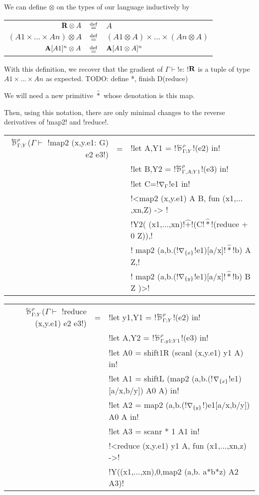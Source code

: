 We can define $\otimes$ on the types of our language inductively by

\begin{tabular}{r c l}
    $\mathbf{R} \otimes A$ & $\stackrel {\mathrm{def}}=$ & $A$ \\
    $(A1 \times \ldots \times An)\otimes A$ & $\stackrel {\mathrm{def}}=$ & $(A1\otimes A) \times \ldots \times (An \otimes A)$ \\
    $\mathbf{A}[A1]^{n} \otimes A$ & $\stackrel {\mathrm{def}}=$ & $\mathbf{A}[A1\otimes A]^{n}$
\end{tabular}

With this definition, we recover that the gradient of $\Gamma \vdash$!e: !$\mathbf{R}$ is a tuple of type $A1\times\ldots\times An$ as expected.
TODO: define *, finish D(reduce)

We will need a new primitive $\widehat{*}$ whose denotation is this map.

Then, using this notation, there are only minimal changes to the reverse derivatives of !map2! and !reduce!.

\begin{center}
\begin{tabular}{r c l}
    $\directD{\rho}{\Gamma}{Y}$($\Gamma\vdash $ !map2 (x,y.e1: G) e2 e3!) &=&  
    !let A,Y1 = !$\directD{\rho}{\Gamma}{Y}$!(e2) in! \\
    && !let B,Y2 = !$\directD{\rho}{\Gamma,A}{Y1}$!(e3) in! \\
    && !let C=!$\nabla_{\Gamma}$!e1 in!\\
    && !<map2 (x,y.e1) A B, fun (x1,$\ldots$,xn,Z) -> !\\
    && !Y2( (x1,$\ldots$,xn)!$\widehat{+}$!(C!$\widehat{*}$!(reduce + 0 Z)),!\\
    && \quad\quad! map2 (a,b.(!$\nabla_{\{x\}}$!e1)[a/x]!$\widehat{*}$!b) A Z,!\\
    && \quad\quad! map2 (a,b.(!$\nabla_{\{y\}}$!e1)[a/x]!$\widehat{*}$!b) B Z )>!\\
    \end{tabular}
    \end{center}

\begin{center}
\begin{tabular}{r c l}
        $\directD{\rho}{\Gamma}{Y}$($\Gamma\vdash $ !reduce (x,y.e1) e2 e3!) 
        &=&  !let y1,Y1 = !$\directD{\rho}{\Gamma}{Y}$!(e2) in! \\
        && !let A,Y2 = !$\directD{\rho}{\Gamma,y1}{Y1}$!(e3) in! \\
        && !let A0 = shift1R (scanl (x,y.e1) y1 A) in! \\
        && !let A1 = shiftL (map2 (a,b.(!$\nabla_{\{x\}}$!e1)[a/x,b/y]) A0 A) in! \\
        && !let A2 = map2 (a,b.(!$\nabla_{\{y\}}$!)e1[a/x,b/y]) A0 A in! \\
        && !let A3 = scanr * 1 A1 in! \\
        && !<reduce (x,y.e1) y1 A, fun (x1,$\ldots$,xn,z) ->! \\
        && !Y((x1,$\ldots$,xn),0,map2 (a,b. a*b*z) A2 A3)!
\end{tabular}
\end{center}

